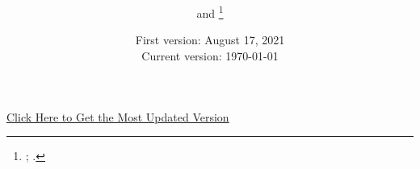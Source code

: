 \documentclass[12pt,english]{article}
\begin{document}
\title{
\onehalfspacing
\PAPERTITLE
}

\author{
\AUTHORHADAH{} and \AUTHORCOMP{}\thanks{
\AUTHORHADAHINFO;
\AUTHORCOMPINFO.
\ACKNOWLEDGMENTS
}}

\date{
    First version: August 17, 2021 \\
    Current version: \today
}

\maketitle

\begin{center}
\href{https://hhadah.github.io/compta-hadah/compta_hadah_2025.pdf}{\footnotesize{Click Here to Get the Most Updated Version}}
\end{center}

\begin{abstract}
\singlespacing
\PAPERABSTRACT
\end{abstract}
\vfil
\hfil \small\PAPERKEYWORDS \hfil
\vfil
\thispagestyle{empty}
\clearpage

\setcounter{page}{1}
\renewcommand*{\thefootnote}{\arabic{footnote}}

\clearpage

\begingroup
{}
\setlength\bibitemsep{5pt}
\printbibliography[title=References]
\endgroup
\pagebreak



\appendix
\setlength{\footnotemargin}{5.75mm}



% 
\clearpage
\end{document}
